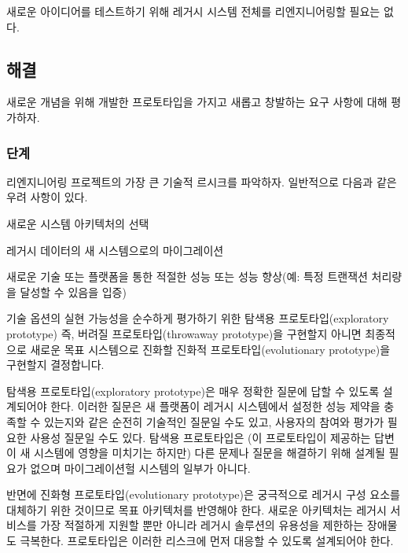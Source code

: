 \documentclass[a4paper,10pt,twoside]{book}
\begin{document}
\begin{bulletlist}
\item 새로운 아이디어를 테스트하기 위해 레거시 시스템 전체를 리엔지니어링할 필요는 없다.
\end{bulletlist}

\subsection*{해결}

새로운 개념을 위해 개발한 프로토타입을 가지고 새롭고 창발하는 요구 사항에 대해 평가하자.

\subsubsection*{단계}

\begin{bulletlist}
\item 리엔지니어링 프로젝트의 가장 큰 기술적 르시크를 파악하자. 일반적으로 다음과 같은 우려 사항이 있다.

\begin{bulletlist}
\item 새로운 시스템 아키텍처의 선택
\item 레거시 데이터의 새 시스템으로의 마이그레이션
\item 새로운 기술 또는 플랫폼을 통한 적절한 성능 또는 성능 향상(예: 특정 트랜잭션 처리량을 달성할 수 있음을 입증)
\end{bulletlist}

\item 기술 옵션의 실현 가능성을 순수하게 평가하기 위한 탐색용 프로토타입(exploratory prototype) 즉, 버려질 프로토타입(throwaway prototype)을 구현할지 아니면 최종적으로 새로운 목표 시스템으로 진화할 진화적 프로토타입(evolutionary prototype)을 구현할지 결정합니다.

\begin{bulletlist}
\item 탐색용 프로토타입(exploratory prototype)은 매우 정확한 질문에 답할 수 있도록 설계되어야 한다. 이러한 질문은 새 플랫폼이 레거시 시스템에서 설정한 성능 제약을 충족할 수 있는지와 같은 순전히 기술적인 질문일 수도 있고, 사용자의 참여와 평가가 필요한 사용성 질문일 수도 있다. 탐색용 프로토타입은 (이 프로토타입이 제공하는 답변이 새 시스템에 영향을 미치기는 하지만) 다른 문제나 질문을 해결하기 위해 설계될 필요가 없으며 마이그레이션헐 시스템의 일부가 아니다.

\item 반면에 진화형 프로토타입(evolutionary prototype)은 궁극적으로 레거시 구성 요소를 대체하기 위한 것이므로 목표 아키텍처를 반영해야 한다. 새로운 아키텍처는 레거시 서비스를 가장 적절하게 지원할 뿐만 아니라 레거시 솔루션의 유용성을 제한하는 장애물도 극복한다. 프로토타입은 이러한 리스크에 먼저 대응할 수 있도록 설계되어야 한다.
\end{bulletlist}
\end{bulletlist}
\end{document}

